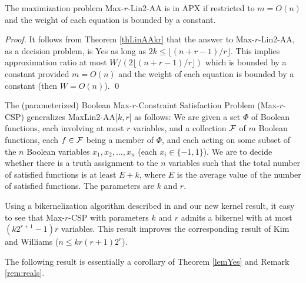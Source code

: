 \documentclass{llncs}
\begin{document}
\begin{corollary}
The maximization problem {\sc Max-$r$-Lin2-AA} is in APX if restricted to $m=O(n)$ and the weight of each equation is bounded by a constant.
\end{corollary}
\begin{proof}
It follows from Theorem \ref{thLinAAkr} that the answer to {\sc Max-$r$-Lin2-AA}, as a decision problem, is {\sc Yes} as long as $2k\le \lfloor (n+r-1)/r\rfloor.$
This implies approximation ratio at most $W/(2\lfloor (n+r-1)/r\rfloor)$ which is bounded by a constant provided $m=O(n)$ and the weight of each equation is bounded by a constant (then $W=O(n)$).
\qed \end{proof}

The (parameterized) Boolean Max-$r$-Constraint Satisfaction Problem ({\sc Max-$r$-CSP}) generalizes {\sc MaxLin2-AA}[$k,r$]
as follows: We are given a set $\Phi$ of Boolean functions, each involving at
most $r$ variables, and a collection ${\cal F}$ of $m$ Boolean functions, each $f \in \cal F$ being a
member of $\Phi$, and each acting on some subset of
the $n$ Boolean variables $x_1,x_2, \ldots ,x_n$ (each $x_i\in \{-1,1\}$). We are to decide whether there is a truth
assignment to the $n$ variables such that the total number of satisfied functions is at least $E+k$, where  $E$ is the
average value of the number of satisfied functions. The parameters are $k$ and $r$.

Using a bikernelization algorithm described in
\cite{AloGutKimSzeYeo11,CroGutJonKimRuz10} and our new kernel result, it
easy to see that {\sc Max-$r$-CSP} with parameters $k$ and $r$ admits a
bikernel with at most $(k2^{r+1}-1)r$ variables. This result improves the
corresponding result of Kim and Williams \cite{KimWil} ($n\le
kr(r+1)2^r$).

The following result is essentially a corollary of Theorem \ref{lemYes} and Remark \ref{rem:reals}.
\end{document}
